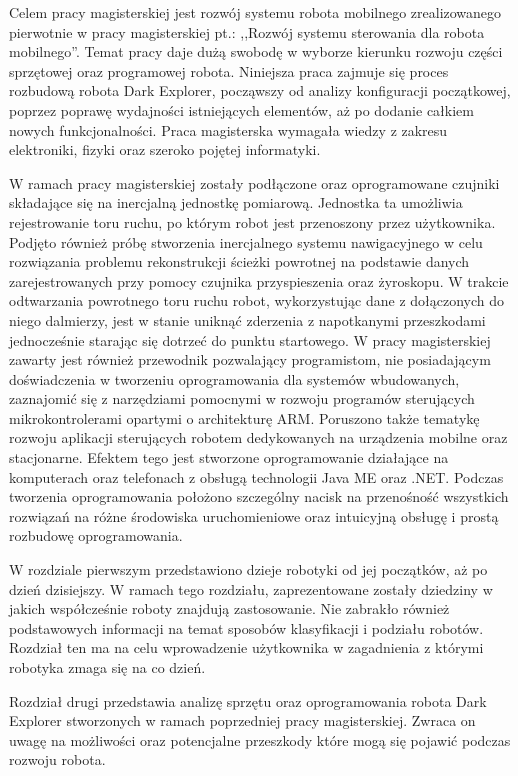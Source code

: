 Celem pracy magisterskiej jest rozwój systemu robota mobilnego
zrealizowanego pierwotnie w pracy magisterskiej pt.: ,,Rozwój systemu sterowania
dla robota mobilnego''\cite{KmakMScThesis2009}. Temat pracy daje dużą swobodę w
wyborze kierunku rozwoju części sprzętowej oraz programowej robota. Niniejsza
praca zajmuje się proces rozbudową robota Dark Explorer, począwszy od analizy
konfiguracji początkowej, poprzez poprawę wydajności istniejących elementów, aż
po dodanie całkiem nowych funkcjonalności. Praca magisterska wymagała wiedzy z
zakresu elektroniki, fizyki oraz szeroko pojętej informatyki.

W ramach pracy magisterskiej zostały podłączone oraz oprogramowane czujniki
składające się na inercjalną jednostkę pomiarową. Jednostka ta umożliwia
rejestrowanie toru ruchu, po którym robot jest przenoszony przez użytkownika.
Podjęto również próbę stworzenia inercjalnego systemu nawigacyjnego w celu
rozwiązania problemu rekonstrukcji ścieżki powrotnej na podstawie danych
zarejestrowanych przy pomocy czujnika przyspieszenia oraz żyroskopu. W trakcie
odtwarzania powrotnego toru ruchu robot, wykorzystując dane z dołączonych do
niego dalmierzy, jest w stanie uniknąć zderzenia z napotkanymi przeszkodami
jednocześnie starając się dotrzeć do punktu startowego. W pracy magisterskiej
zawarty jest również przewodnik pozwalający programistom, nie posiadającym
doświadczenia w tworzeniu oprogramowania dla systemów wbudowanych, zaznajomić się
z narzędziami pomocnymi w rozwoju programów sterujących mikrokontrolerami
opartymi o architekturę ARM. Poruszono także tematykę rozwoju aplikacji
sterujących robotem dedykowanych na urządzenia mobilne oraz stacjonarne. Efektem
tego jest stworzone oprogramowanie działające na komputerach oraz telefonach z
obsługą technologii Java ME oraz .NET. Podczas tworzenia oprogramowania położono
szczególny nacisk na przenośność wszystkich rozwiązań na różne środowiska
uruchomieniowe oraz intuicyjną obsługę i prostą rozbudowę oprogramowania.

W rozdziale pierwszym przedstawiono dzieje robotyki od jej początków, aż po dzień
dzisiejszy. W ramach tego rozdziału, zaprezentowane zostały dziedziny w jakich
współcześnie roboty znajdują zastosowanie. Nie zabrakło również podstawowych
informacji na temat sposobów klasyfikacji i podziału robotów. Rozdział ten ma na
celu wprowadzenie użytkownika w zagadnienia z którymi robotyka zmaga się na co
dzień.

Rozdział drugi przedstawia analizę sprzętu oraz oprogramowania robota Dark
Explorer stworzonych w ramach poprzedniej pracy magisterskiej. Zwraca on uwagę na
możliwości oraz potencjalne przeszkody które mogą się pojawić podczas rozwoju
robota.

